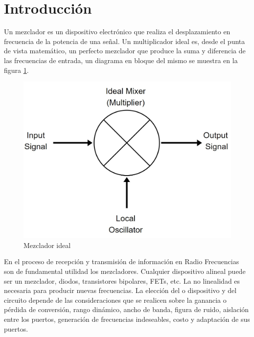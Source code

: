 \documentclass[twocolumn]{article}
\begin{document}
\onecolumn
\tableofcontents
\clearpage

\twocolumn
\section{Introducción}
Un mezclador es un dispositivo electrónico que realiza el desplazamiento en frecuencia de la potencia de una señal. Un multiplicador ideal es, desde el punta de vista matemático, un perfecto mezclador que produce la suma y diferencia de las frecuencias de entrada, un diagrama en bloque del mismo se muestra en la figura \textcolor{blue}{\ref{fig:fig0}}.

\begin{figure}[!ht]
  \centering    
	\includegraphics[scale=0.3]{imagenes/fig0.jpg}
	\caption{Mezclador ideal}\label{fig:fig0}
\end{figure}

En el proceso de recepción y transmisión de información en Radio Frecuencias son de fundamental utilidad los mezcladores. Cualquier dispositivo alineal puede ser un mezclador, diodos, transistores bipolares, FETs, etc. La no linealidad es necesaria para producir nuevas frecuencias. La elección del o dispositivo y del circuito depende de las consideraciones que se realicen sobre la ganancia o pérdida de conversión, rango dinámico, ancho de banda, figura de ruido, aislación entre los puertos, generación de frecuencias indeseables, costo y adaptación de sus puertos.
\end{document}
